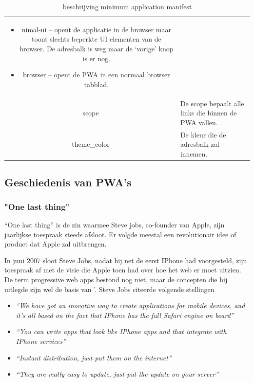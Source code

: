 \begin{table}[H]
\begin{tabular}{cp{12cm}}
\begin{itemize}
			     		  \item nimal-ui – opent de applicatie in de browser maar toont slechts beperkte UI elementen van de browser. De adresbalk is weg maar de ‘vorige’ knop is er nog.
			     		  \item browser – opent de PWA in een normaal browser tabblad.
		     		\end{itemize} \\
	     		scope & De scope bepaalt alle links die binnen de PWA vallen. \\
	     		theme\_color & De kleur die de adresbalk zal innemen.
			\end{tabular}	
			\caption{beschrijving minimum application manifest}
		\end{table}
				
			
	
	
	\autocite{LePage2020}

\subsection{Geschiedenis van PWA's}

	\subsubsection{"One last thing"}

		 “One last thing” is de zin waarmee Steve jobs, co-founder van Apple, zijn jaarlijkse toespraak steeds afsloot. Er volgde meestal een revolutionair idee of product dat Apple zal uitbrengen.
		
		In juni 2007 sloot Steve Jobs, nadat hij net de eerst IPhone had voorgesteld, zijn toespraak af met de visie die Apple toen had over hoe het web er moet uitzien. De term progressive web apps bestond nog niet, maar de concepten die hij uitlegde zijn wel de basis van '. Steve Jobs citeerde volgende stellingen
	
		
		\begin{itemize}
			\item \textit{ “We have got an inovative way to create applications for mobile devices, and it’s all based on the fact that IPhone has the full Safari engine on board”}
			\item \textit{ “You can write apps that look like IPhone apps and that integrate with IPhone services”}
			\item \textit{ “Instant distribution, just put them on the internet”}
			\item \textit{ “They are really easy to update, just put the update on your server”}
		\end{itemize}
		\autocite{Jobs2007}
		
